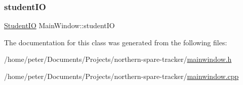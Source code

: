 \subsubsection{\texorpdfstring{student\+IO}{studentIO}}
{\footnotesize\ttfamily \hyperlink{class_student_i_o}{Student\+IO} Main\+Window\+::student\+IO\hspace{0.3cm}{\ttfamily [static]}}



The documentation for this class was generated from the following files\+:\begin{DoxyCompactItemize}
\item 
/home/peter/\+Documents/\+Projects/northern-\/spare-\/tracker/\hyperlink{mainwindow_8h}{mainwindow.\+h}\item 
/home/peter/\+Documents/\+Projects/northern-\/spare-\/tracker/\hyperlink{mainwindow_8cpp}{mainwindow.\+cpp}\end{DoxyCompactItemize}
